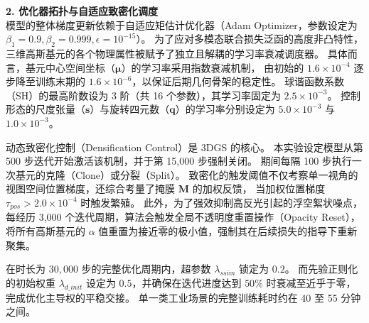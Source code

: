 \textbf{2. 优化器拓扑与自适应致密化调度} \\
模型的整体梯度更新依赖于自适应矩估计优化器（Adam Optimizer，参数设定为 $\beta_1=0.9, \beta_2=0.999, \epsilon=10^{-15}$）。
为了应对多模态联合损失泛函的高度非凸特性，三维高斯基元的各个物理属性被赋予了独立且解耦的学习率衰减调度器。
具体而言，基元中心空间坐标（$\bm{\mu}$）的学习率采用指数衰减机制，
由初始的 $1.6 \times 10^{-4}$ 逐步降至训练末期的 $1.6 \times 10^{-6}$，以保证后期几何骨架的稳定性。
球谐函数系数（SH）的最高阶数设为 3 阶（共 16 个参数），其学习率固定为 $2.5 \times 10^{-3}$。
控制形态的尺度张量（$\bm{s}$）与旋转四元数（$\bm{q}$）的学习率分别设定为 $5.0 \times 10^{-3}$ 与 $1.0 \times 10^{-3}$。

动态致密化控制（Densification Control）是 3DGS 的核心。
本实验设定模型从第 500 步迭代开始激活该机制，并于第 15,000 步强制关闭。
期间每隔 100 步执行一次基元的克隆（Clone）或分裂（Split）。
致密化的触发阈值不仅考察单一视角的视图空间位置梯度，还综合考量了掩膜 $\bm{M}$ 的加权反馈，
当加权位置梯度 $\tau_{pos} > 2.0 \times 10^{-4}$ 时触发繁殖。
此外，为了强效抑制高反光引起的浮空絮状噪点，每经历 3,000 个迭代周期，算法会触发全局不透明度重置操作（Opacity Reset），
将所有高斯基元的 $\alpha$ 值重置为接近零的极小值，强制其在后续损失的指导下重新聚集。

在时长为 $30,000$ 步的完整优化周期内，超参数 $\lambda_{ssim}$ 锁定为 $0.2$。
而先验正则化的初始权重 $\lambda_{d\_init}$ 设定为 $0.5$，并确保在迭代进度达到 $50\%$ 时衰减至近乎于零，完成优化主导权的平稳交接。
单一类工业场景的完整训练耗时约在 40 至 55 分钟之间。

